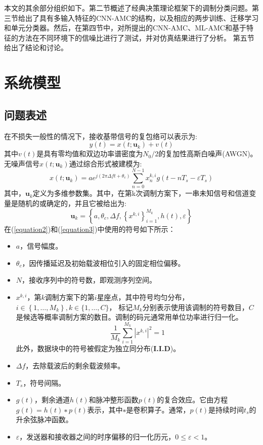 \documentclass[final]{cvpr}
\begin{document}
本文的其余部分组织如下。第二节概述了经典决策理论框架下的调制分类问题。第三节给出了具有多输入特征的CNN-AMC的结构，以及相应的两步训练、迁移学习和单元分类器。然后，在第四节中，对所提出的CNN-AMC、ML-AMC和基于特征的方法在不同环境下的信噪比进行了测试，并对仿真结果进行了分析。
第五节给出了结论和讨论。
\section{系统模型}
\label{sec:SystemModel}
\subsection{问题表述}
\label{sec:Problemfor}
在不损失一般性的情况下，接收基带信号的复包络可以表示为:
\begin{equation}
y(t)=x\left(t ; \mathbf{u}_{k}\right)+v(t)\label{equation1}
\end{equation}
其中$v(t)$是具有零均值和双边功率谱密度为$N_0/2$的复加性高斯白噪声(AWGN)。无噪声信号$x\left(t ; \mathbf{u}_{k}\right)$通过综合形式被建模为:
\begin{equation}
x\left(t ; \mathbf{u}_{k}\right)=a e^{j\left(2 \pi \Delta f t+\theta_{c}\right)} \sum_{n=0}^{N-1} x_{n}^{k, i} g\left(t-n T_{s}-\varepsilon T_{s}\right)\label{equation2}
\end{equation}
其中，$\mathbf{u}_{k}$定义为多维参数集。其中，在第k次调制方案下，一串未知信号和信道变量是随机的或确定的，并且它被给出为:
\begin{equation}
\mathbf{u}_{k}=\left\{a, \theta_{c}, \Delta f,\left\{x^{k, i}\right\}_{i=1}^{M_{k}}, h(t), \varepsilon\right\}\label{equation3}
\end{equation}
在(\ref{equation2})和(\ref{equation3})中使用的符号如下所示：
\begin{itemize}
\item $a$，信号幅度。
\item $\theta_{c}$，因传播延迟及初始载波相位引入的固定相位偏移。
\item $N$，接收序列中的符号数，即观测序列空间。
\item $x^{k, i}$，第$k$调制方案下的第$i$星座点，其中符号均匀分布，
$i \in\left\{1, \ldots, M_{k}\right\}, k \in\{1, \ldots, C\}$，
标记$M_k$分别表示使用该调制的符号数目，$C$是候选等概率调制方案的数目。调制的码元通常用单位功率进行归一化。
\begin{equation}
\frac{1}{M_{k}} \sum_{i=1}^{M_{k}}\left|x^{k, i}\right|^{2}=1\label{equation4}
\end{equation}
此外，数据块中的符号被假定为独立同分布(\textbf{I.I.D})。
\item $\Delta f$，去除载波后的剩余载波频率。
\item $T_s$，符号间隔。
\item $g(t)$，剩余通道$h(t)$和脉冲整形函数$p(t)$的复合效应。它由方程$g(t)=h(t)∗p(t)$表示，其中$∗$是卷积算子。通常，$p(t)$是持续时间$t_s$的升余弦脉冲函数。
\item $\varepsilon$，发送器和接收器之间的时序偏移的归一化历元，$0≤ε<1$。
\end{itemize}
\end{document}
